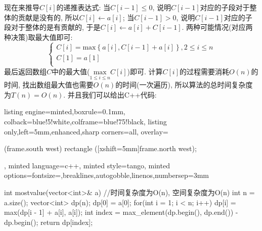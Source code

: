 \documentclass{article}
\begin{document}
\begin{homeworkProblem}
	现在来推导$C[i]$的递推表达式: 当$C[i-1]\leq 0$, 说明$C[i-1]$对应的子段对于整体的贡献是没有的, 所以$C[i]\gets a[i]$; 当$C[i-1]>0$, 说明$C[i-1]$对应的子段对于整体的是有贡献的, 于是$C[i]\gets a[i]+C[i-1]$. 两种可能情况(对应两种决策)取最大值即可:$$\begin{cases}
		C\left[ i \right] =\text{max} \left\{ a\left[ i \right] ,C\left[ i-1 \right] +a\left[ i \right] \right\} , 2\le i\le n\\
		C\left[ 1 \right] =a\left[ 1 \right]\\
	\end{cases}
	$$
	最后返回数组$C$中的最大值($\displaystyle \underset{1\le i\le n}{\text{max}}C\left[ i \right] $)即可. 计算$C[i]$的过程需要消耗$O(n)$的时间, 找出数组最大值也需要$O(n)$的时间(一次遍历), 所以算法的总时间复杂度为$T(n)=O(n)$. 并且我们可以给出C++代码:
\begin{tcblisting}{listing engine=minted,boxrule=0.1mm,
colback=blue!5!white,colframe=blue!75!black,
listing only,left=5mm,enhanced,sharp corners=all,
overlay={\begin{tcbclipinterior} (frame.south west)
rectangle ([xshift=5mm]frame.north west);\end{tcbclipinterior}},
minted language=c++,
minted style=tango,
minted options={fontsize=\small,breaklines,autogobble,linenos,numbersep=3mm}}
int mostvalue(vector<int>& a) { //时间复杂度为O(n), 空间复杂度为O(n)
    int n = a.size();
    vector<int> dp(n);
    dp[0] = a[0];
    for(int i = 1; i < n; i++) {
        dp[i] = max(dp[i - 1] + a[i], a[i]);
    }
    int index = max_element(dp.begin(), dp.end()) - dp.begin();
    return dp[index];
}
\end{tcblisting}
\end{homeworkProblem}


\pagebreak
\end{document}
